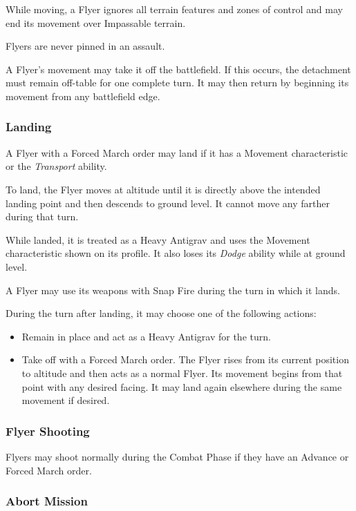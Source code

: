 While moving, a Flyer ignores all terrain features and zones of control and may end its movement over Impassable terrain.

Flyers are never pinned in an assault.

A Flyer's movement may take it off the battlefield. If this occurs, the detachment must remain off-table for one complete turn. It may then return by beginning its movement from any battlefield edge.

\subsubsection{Landing}

A Flyer with a Forced March order may land if it has a Movement characteristic or the \textit{Transport} ability.

To land, the Flyer moves at altitude until it is directly above the intended landing point and then descends to ground level. It cannot move any farther during that turn.

While landed, it is treated as a Heavy Antigrav and uses the Movement characteristic shown on its profile. It also loses its \textit{Dodge} ability while at ground level.

A Flyer may use its weapons with Snap Fire during the turn in which it lands.

During the turn after landing, it may choose one of the following actions:

\begin{itemize}
    \item Remain in place and act as a Heavy Antigrav for the turn.

    \item Take off with a Forced March order. The Flyer rises from its current position to altitude and then acts as a normal Flyer. Its movement begins from that point with any desired facing. It may land again elsewhere during the same movement if desired.
\end{itemize}

\subsubsection{Flyer Shooting}

Flyers may shoot normally during the Combat Phase if they have an Advance or Forced March order.

\subsubsection{Abort Mission}

